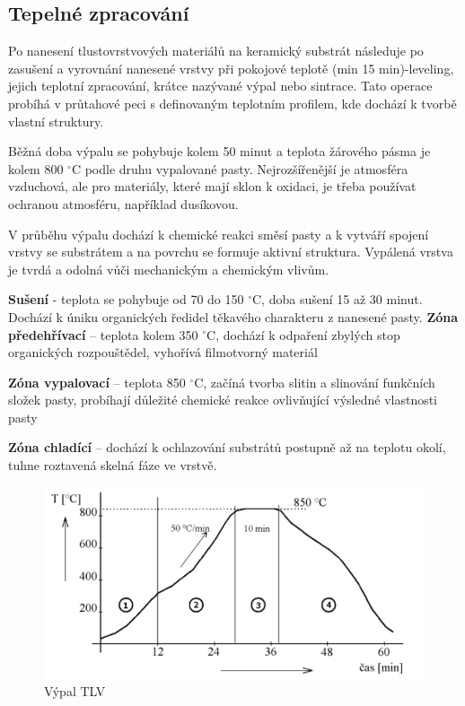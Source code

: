 \subsection{Tepelné zpracování}
Po nanesení tlustovrstvových materiálů na keramický substrát následuje po zasušení a
vyrovnání nanesené vrstvy při pokojové teplotě (min 15 min)-leveling, jejich teplotní zpracování, krátce nazývané výpal nebo sintrace. Tato operace probíhá v průtahové peci s definovaným teplotním profilem, kde dochází k tvorbě vlastní struktury.

Běžná doba výpalu se pohybuje kolem 50 minut a teplota žárového pásma je kolem 800 $^{\circ}$C podle druhu vypalované pasty. Nejrozšířenější je atmosféra vzduchová, ale pro materiály, které mají sklon k oxidaci, je třeba používat ochranou atmosféru,
například dusíkovou.

V průběhu výpalu dochází k chemické reakci směsí pasty a k vytváří spojení
vrstvy se substrátem a na povrchu se formuje aktivní struktura. Vypálená vrstva je tvrdá a odolná vůči mechanickým a chemickým vlivům.

\textbf{Sušení} - teplota se pohybuje od 70 do 150 $^{\circ}$C, doba sušení 15 až 30 minut. Dochází k úniku organických ředidel
těkavého charakteru z nanesené pasty.
\textbf{Zóna předehřívací} – teplota kolem 350 $^{\circ}$C, dochází k odpaření zbylých stop organických rozpouštědel, vyhořívá filmotvorný materiál

\textbf{Zóna vypalovací} – teplota 850 $^{\circ}$C, začíná tvorba slitin a slinování funkčních složek pasty, probíhají důležité chemické reakce ovlivňující výsledné vlastnosti pasty

\textbf{Zóna chladící} – dochází k ochlazování substrátů postupně až na teplotu okolí, tuhne roztavená skelná fáze ve vrstvě.

\begin{figure}[h]
   \begin{center}
     \includegraphics[scale=0.6]{images/Vypal.png}
   \end{center}
   \caption{Výpal TLV}
\end{figure}

